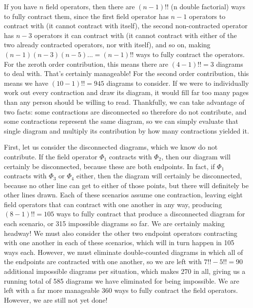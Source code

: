 \documentclass{report}
\begin{document}
If you have $n$ field operators, then there are $(n-1)!!$ (n double factorial) ways to fully contract them, since the first field operator has $n-1$ operators to contract with (it cannot contract with itself), the second non-contracted operator has $n-3$ operators it can contract with (it cannot contract with either of the two already contracted operators, nor with itself), and so on, making $(n-1)(n-3)(n-5)...=(n-1)!!$ ways to fully contract the operators. For the zeroth order contribution, this means there are $(4-1)!! = 3$ diagrams to deal with. That's certainly manageable! For the second order contribution, this means we have $(10-1)!! = 945$ diagrams to consider. If we were to individually work out every contraction and draw its diagram, it would fill far too many pages than any person should be willing to read. Thankfully, we can take advantage of two facts: some contractions are disconnected so therefore do not contribute, and some contractions represent the same diagram, so we can simply evaluate that single diagram and multiply its contribution by how many contractions yielded it.

First, let us consider the disconnected diagrams, which we know do not contribute. If the field operator $\Phi_1$ contracts with $\Phi_2$, then our diagram will certainly be disconnected, because these are both endpoints. In fact, if $\Phi_1$ contracts with $\Phi_3$ or $\Phi_4$ either, then the diagram will certainly be disconnected, because no other line can get to either of those points, but there will definitely be other lines drawn. Each of these scenarios assume one contraction, leaving eight field operators that can contract with one another in any way, producing $(8-1)!! = 105$ ways to fully contract that produce a disconnected diagram for each scenario, or 315 impossible diagrams so far. We are certainly making headway! We must also consider the other two endpoint operators contracting with one another in each of these scenarios, which will  in turn happen in 105 ways each. However, we must eliminate double-counted diagrams in which all of the endpoints are contracted with one another, so we are left with $7!! - 5!! = 90$ additional impossible diagrams per situation, which makes 270 in all, giving us a running total of 585 diagrams we have eliminated for being impossible. We are left with a far more manageable 360 ways to fully contract the field operators. However, we are still not yet done!
\end{document}
